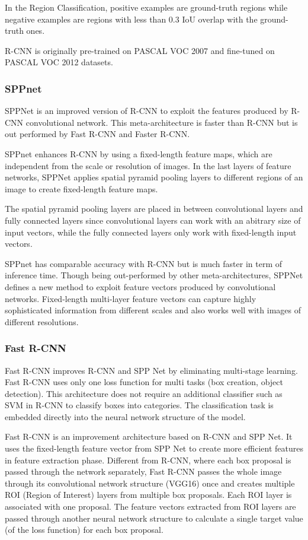 \documentclass[conference]{IEEEtran}
\begin{document}
In the Region Classification, positive examples are ground-truth regions while negative examples are regions with less than 0.3 IoU overlap with the ground-truth ones.

R-CNN is originally pre-trained on PASCAL VOC 2007 and fine-tuned on PASCAL VOC 2012 datasets. 

\subsubsection{SPPnet}
SPPNet is an improved version of R-CNN to exploit the features produced by R-CNN convolutional network. This meta-architecture is faster than R-CNN but is out performed by Fast R-CNN and Faster R-CNN.

SPPnet enhances R-CNN by using a fixed-length feature maps, which are independent from the scale or resolution of images. In the last layers of feature networks, SPPNet applies spatial pyramid pooling layers to different regions of an image to create fixed-length feature maps.

The spatial pyramid pooling layers are placed in between convolutional layers and fully connected layers since convolutional layers can work with an abitrary size of input vectors, while the fully connected layers only work with fixed-length input vectors.

SPPnet has comparable accuracy with R-CNN but is much faster in term of inference time. Though being out-performed by other meta-architectures, SPPNet defines a new method to exploit feature vectors produced by convolutional networks. Fixed-length multi-layer feature vectors can capture highly sophisticated information from different scales and also works well with images of different resolutions.

\subsubsection{Fast R-CNN}
Fast R-CNN improves R-CNN and SPP Net by eliminating multi-stage learning. Fast R-CNN uses only one loss function for multi tasks (box creation, object detection). This architecture does not require an additional classifier such as SVM in R-CNN to classify boxes into categories. The classification task is embedded directly into the neural network structure of the model.

Fast R-CNN is an improvement architecture based on R-CNN and SPP Net. It uses the fixed-length feature vector from SPP Net to create more efficient features in feature extraction phase. Different from R-CNN, where each box proposal is passed through the network separately, Fast R-CNN passes the whole image through its convolutional network structure (VGG16) once and creates multiple ROI (Region of Interest) layers from multiple box proposals. Each ROI layer is associated with one proposal. The feature vectors extracted from ROI layers are passed through another neural network structure to calculate a single target value (of the loss function) for each box proposal.
\end{document}
